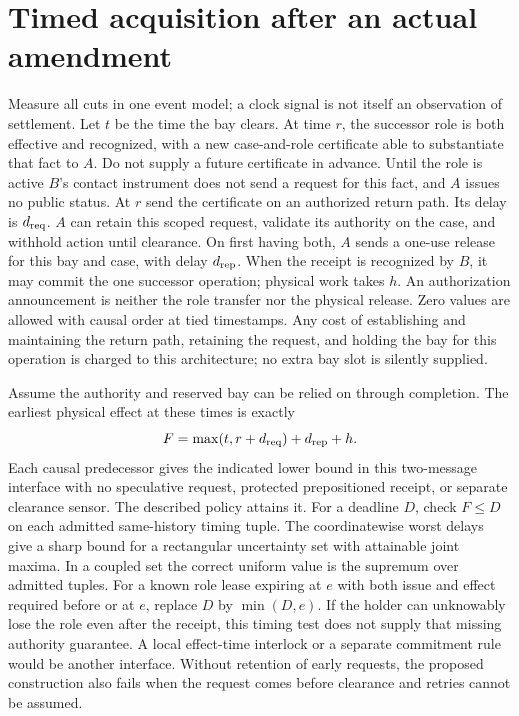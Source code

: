 \documentclass[11pt]{article}
\begin{document}
\section{Timed acquisition after an actual amendment}
Measure all cuts in one event model; a clock signal is not itself
an observation of settlement. Let \(t\) be the time the bay clears.
At time \(r\), the successor role is both effective and recognized,
with a new case-and-role certificate able to substantiate that
fact to \(A\). Do not supply a future certificate in advance.
Until the role is active \(B\)'s contact instrument does not send
a request for this fact, and \(A\) issues no public status.
At \(r\) send the certificate on an authorized return path.
Its delay is \(d_{\rm req}\). \(A\) can retain this scoped request,
validate its authority on the case, and withhold action until
clearance. On first having both, \(A\) sends a one-use release for
this bay and case, with delay \(d_{\rm rep}\). When the receipt is
recognized by \(B\), it may commit the one successor
operation; physical work takes \(h\). An authorization
announcement is neither the role transfer nor the physical release.
Zero values are allowed with causal order at tied timestamps.
Any cost of establishing and maintaining the return path, retaining
the request, and holding the bay for this operation is charged
to this architecture; no extra bay slot is silently supplied.

Assume the authority and reserved bay can be relied on through
completion. The earliest physical effect at these times is exactly
\[
           F=\max(t,r+d_{\rm req})+d_{\rm rep}+h .
\]
Each causal predecessor gives the indicated lower bound in this
two-message interface with no speculative request, protected
prepositioned receipt, or separate clearance sensor. The described
policy attains it. For a deadline \(D\), check \(F\le D\) on each
admitted same-history timing tuple. The coordinatewise worst
delays give a sharp bound for a rectangular uncertainty set
with attainable joint maxima. In a coupled set the correct
uniform value is the supremum over admitted tuples.
For a known role lease expiring at \(e\) with both issue and
effect required before or at \(e\), replace \(D\) by
\(\min(D,e)\). If the holder can unknowably lose the role even
after the receipt, this timing test does not supply that missing
authority guarantee. A local effect-time interlock or a separate
commitment rule would be another interface. Without retention
of early requests, the proposed construction also fails when
the request comes before clearance and retries cannot be assumed.
\end{document}

